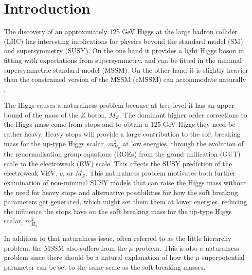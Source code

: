 \documentclass[preprint,amsmath,amssymb,aps,superscriptaddress,prd,showpacs,floatfix]{revtex4-1}
\begin{document}
\maketitle

\section{\label{sec:intro}Introduction}
The discovery of an approximately 125 GeV Higgs
\cite{Aad:2012tfa,Chatrchyan:2012ufa} at the large hadron collider
(LHC) has interesting implications for physics beyond the standard
model (SM) and supersymmetry (SUSY).  On the one hand it provides a
light Higgs boson in fitting with expectations from supersymmetry, and
can be fitted in the minimal supersymmetric standard model (MSSM).  On
the other hand it is slightly heavier than the constrained version of the 
MSSM (cMSSM) can accommodate naturally \cite{Cassel:2011zd,Ghilencea:2012gz}.

The Higgs causes a naturalness problem because at tree level it has an
upper bound of the mass of the $Z$ boson, $M_Z$. The dominant higher
order corrections to the Higgs mass come from stops and to obtain a
$125$ GeV Higgs they need be rather heavy. Heavy stops will provide a
large contribution to the soft breaking mass for the up-type Higgs
scalar, $m_{H_u}^2$ at low energies, through the evolution of the
renormalisation group equations (RGEs) from the grand unification
(GUT) scale to the electroweak (EW) scale. This affects the SUSY
prediction of the electroweak VEV, $v$, or $M_Z$.  This naturalness
problem motivates both further examination of non-minimal SUSY models
that can raise the Higgs mass without the need for heavy stops and
alternative possibilities for how the soft breaking parameters get
generated, which might set them them at lower energies, reducing the
influence the stops have on the soft breaking mass for the up-type
Higgs scalar, $m_{H_u}^2$.

In addition to that naturalness issue, often referred to as the little
hierarchy problem, the MSSM also suffers from the $\mu$-problem. This
is also a naturalness problem since there should be a natural explanation
of how the $\mu$ superpotential parameter can be set to the same scale
as the soft breaking masses.
\end{document}

